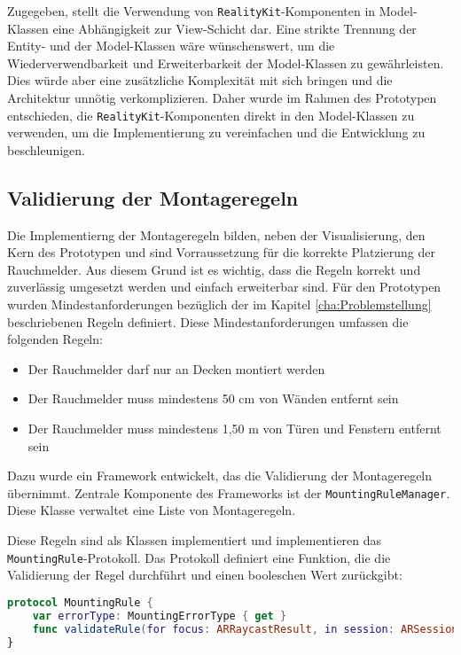 Zugegeben, stellt die Verwendung von \texttt{RealityKit}-Komponenten in Model-Klassen eine Abhängigkeit zur View-Schicht dar. Eine strikte Trennung der Entity- und der Model-Klassen wäre wünschenswert, um die Wiederverwendbarkeit und Erweiterbarkeit der Model-Klassen zu gewährleisten. Dies würde aber eine zusätzliche Komplexität mit sich bringen und die Architektur unnötig verkomplizieren. Daher wurde im Rahmen des Prototypen entschieden, die \texttt{RealityKit}-Komponenten direkt in den Model-Klassen zu verwenden, um die Implementierung zu vereinfachen und die Entwicklung zu beschleunigen.

\subsection{Validierung der Montageregeln}

Die Implementierng der Montageregeln bilden, neben der Visualisierung, den Kern des Prototypen und sind Vorraussetzung für die korrekte Platzierung der Rauchmelder. Aus diesem Grund ist es wichtig, dass die Regeln korrekt und zuverlässig umgesetzt werden und einfach erweiterbar sind. Für den Prototypen wurden Mindestanforderungen bezüglich der im Kapitel \ref{cha:Problemstellung} beschriebenen Regeln definiert. Diese Mindestanforderungen umfassen die folgenden Regeln:

\begin{itemize}
    \item Der Rauchmelder darf nur an Decken montiert werden
    \item Der Rauchmelder muss mindestens 50 cm von Wänden entfernt sein
    \item Der Rauchmelder muss mindestens 1,50 m von Türen und Fenstern entfernt sein
\end{itemize}

Dazu wurde ein Framework entwickelt, das die Validierung der Montageregeln übernimmt. Zentrale Komponente des Frameworks ist der \texttt{MountingRuleManager}. Diese Klasse verwaltet eine Liste von Montageregeln. 

Diese Regeln sind als Klassen implementiert und implementieren das \texttt{MountingRule}-Protokoll. Das Protokoll definiert eine Funktion, die die Validierung der Regel durchführt und einen booleschen Wert zurückgibt:

\begin{lstlisting}[language=Swift]
protocol MountingRule {
    var errorType: MountingErrorType { get }
    func validateRule(for focus: ARRaycastResult, in session: ARSession) async -> Bool
}
\end{lstlisting}


